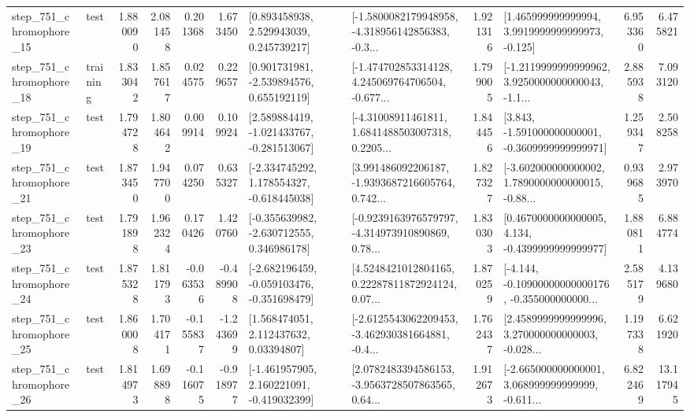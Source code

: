 \begin{tabular}{llrrrrllrlrr}
  step\_751\_chromophore\_15 &      test &      1.880090 &    2.081458 &      0.201368 &  1.673450 &     [0.893458938, 2.529943039, 0.245739217] &  [-1.5800082179948958, -4.318956142856383, -0.3... &       1.921316 &    [1.465999999999994, 3.9919999999999973, -0.125] &            6.953360 &          6.475821 \\
  step\_751\_chromophore\_18 &  training &      1.833042 &    1.857617 &      0.024575 &  0.229657 &    [0.901731981, -2.539894576, 0.655192119] &  [-1.474702853314128, 4.245069764706504, -0.677... &       1.799005 &  [-1.2119999999999962, 3.9250000000000043, -1.1... &            2.885938 &          7.093120 \\
  step\_751\_chromophore\_19 &      test &      1.794728 &    1.804642 &      0.009914 &  0.109924 &   [2.589884419, -1.021433767, -0.281513067] &  [-4.31008911461811, 1.6841488503007318, 0.2205... &       1.844456 &   [3.843, -1.591000000000001, -0.3609999999999971] &            1.259347 &          2.508258 \\
  step\_751\_chromophore\_21 &      test &      1.873450 &    1.947700 &      0.074250 &  0.635327 &   [-2.334745292, 1.178554327, -0.618445038] &  [3.991486092206187, -1.9393687216605764, 0.742... &       1.827327 &  [-3.602000000000002, 1.7890000000000015, -0.88... &            0.939685 &          2.973970 \\
  step\_751\_chromophore\_23 &      test &      1.791898 &    1.962324 &      0.170426 &  1.420760 &   [-0.355639982, -2.630712555, 0.346986178] &  [-0.9239163976579797, -4.314973910890869, 0.78... &       1.830303 &   [0.4670000000000005, 4.134, -0.4399999999999977] &            1.880811 &          6.884774 \\
  step\_751\_chromophore\_24 &      test &      1.875328 &    1.811793 &     -0.063536 & -0.489908 &  [-2.682196459, -0.059103476, -0.351698479] &  [4.5248421012804165, 0.22287811872924124, 0.07... &       1.870259 &  [-4.144, -0.10900000000000176, -0.355000000000... &            2.585179 &          4.139680 \\
  step\_751\_chromophore\_25 &      test &      1.860008 &    1.704171 &     -0.155837 & -1.243699 &      [1.568474051, 2.112437632, 0.03394807] &  [-2.6125543062209453, -3.462930381664881, -0.4... &       1.762437 &  [2.4589999999999996, 3.270000000000003, -0.028... &            1.197338 &          6.621920 \\
  step\_751\_chromophore\_26 &      test &      1.814973 &    1.698898 &     -0.116075 & -0.918977 &   [-1.461957905, 2.160221091, -0.419032399] &  [2.0782483394586153, -3.9563728507863565, 0.64... &       1.912673 &  [-2.665000000000001, 3.068999999999999, -0.611... &            6.822469 &         13.117945 \\

\end{tabular}
